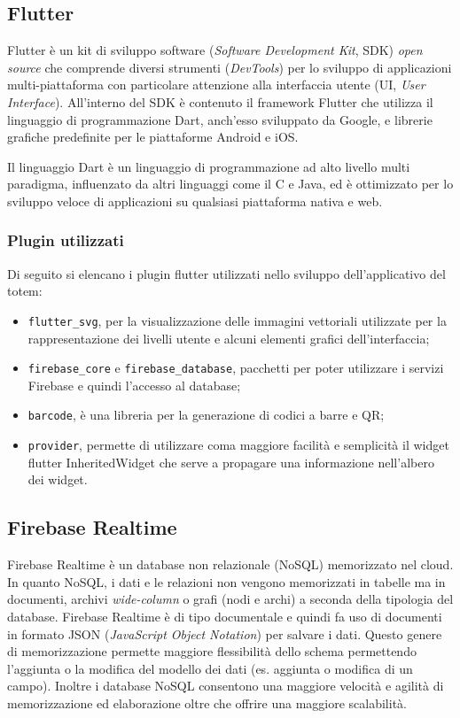 \subsection{Flutter}
Flutter \cite{flutter} è un kit di sviluppo software (\textit{Software Development Kit}, SDK) \textit{open source} che comprende diversi strumenti (\textit{DevTools}) per lo sviluppo di applicazioni multi-piattaforma con particolare attenzione alla interfaccia utente (UI, \textit{User Interface}). All'interno del SDK è contenuto il framework Flutter che utilizza il linguaggio di programmazione Dart, anch'esso sviluppato da Google, e librerie grafiche predefinite per le piattaforme Android e iOS.

Il linguaggio Dart è un linguaggio di programmazione ad alto livello multi paradigma, influenzato da altri linguaggi come il C e Java, ed è ottimizzato per lo sviluppo veloce di applicazioni su qualsiasi piattaforma nativa e web.

\subsubsection{Plugin utilizzati}
Di seguito si elencano i plugin flutter utilizzati nello sviluppo dell'applicativo del totem:

\begin{itemize}
    \item \texttt{flutter\_svg}\cite{providerPlugin}, per la visualizzazione delle immagini vettoriali utilizzate per la rappresentazione dei livelli utente e alcuni elementi grafici dell'interfaccia;
    \item \texttt{firebase\_core}\cite{firebaseCorePlugin} e \texttt{firebase\_database}\cite{firebaseDatabasePlugin}, pacchetti per poter utilizzare i servizi Firebase e quindi l'accesso al database;
    \item \texttt{barcode}\cite{barcodePlugin}, è una libreria per la generazione di codici a barre e QR;
    \item \texttt{provider}\cite{providerPlugin}, permette di utilizzare coma maggiore facilità e semplicità il widget flutter InheritedWidget che serve a propagare una informazione nell'albero dei widget.
    
\end{itemize}
\subsection{Firebase Realtime}
Firebase Realtime \cite{firebase} è un database non relazionale (NoSQL) memorizzato nel cloud. In quanto NoSQL, i dati e le relazioni non vengono memorizzati in tabelle ma in documenti, archivi \textit{wide-column} o grafi (nodi e archi) a seconda della tipologia del database.
Firebase Realtime è di tipo documentale e quindi fa uso di documenti in formato JSON (\textit{JavaScript Object Notation}) per salvare i dati. Questo genere di memorizzazione permette maggiore flessibilità dello schema permettendo l'aggiunta o la modifica del modello dei dati (es. aggiunta o modifica di un campo). Inoltre i database NoSQL consentono una maggiore velocità e agilità di memorizzazione ed elaborazione oltre che offrire una maggiore scalabilità.
%

